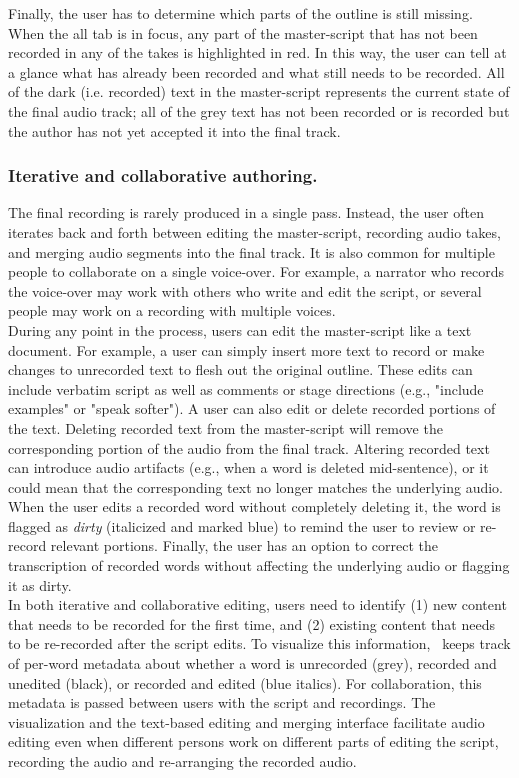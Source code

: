 Finally, the user has to determine which parts of the outline is still missing. When the all tab is in focus, any part of the master-script that has not been recorded in any of the takes is highlighted in red. In this way, the user can tell at a glance what has already been recorded and what still needs to be recorded. All of the dark (i.e. recorded) text in the master-script represents the current state of the final audio track; all of the grey text has not been recorded or is recorded but the author has not yet accepted it into the final track. 

\subsubsection{Iterative and collaborative authoring.} 
The final recording is rarely produced in a single pass. Instead, the user often iterates back
and forth between editing the master-script, recording audio takes, and merging
audio segments into the final track. It is also common for multiple people to collaborate on a single voice-over. For example, a narrator who records the voice-over may work with others who write and edit the script, or several people may work on a recording with multiple voices. \\ 

During any point in the process, users can edit the master-script
like a text document.  For example, a user can simply insert
more text to record or make changes to unrecorded text to flesh
out the original outline. These edits can include verbatim script as well as comments or stage directions (e.g., "include examples" or "speak softer").
A user can also edit or delete recorded portions of the text. Deleting recorded text from the master-script will remove the corresponding portion of the audio from the final track. Altering recorded text can introduce audio artifacts (e.g., when a word is deleted mid-sentence), or it could mean that the corresponding text no longer matches the underlying audio. When the user edits a recorded word without completely deleting it, the word is flagged as \emph{dirty} (italicized and marked blue) to remind the user to review or re-record relevant portions. Finally, the user has an option to correct the transcription of recorded words without affecting the underlying audio or flagging it as dirty.\\

In both iterative and collaborative editing, users need to identify (1) new content that needs to be recorded for the first time, and (2) existing content that needs to be re-recorded after the script edits. To visualize this information, \voicescript\ keeps track of per-word metadata about whether a word is unrecorded (grey), recorded and unedited (black), or recorded and edited (blue italics). For collaboration, this metadata is passed between users with the script and recordings. The visualization and the text-based  editing and merging interface facilitate audio editing even when different persons work on different parts of editing the script, recording the audio and re-arranging the recorded audio. \\ 

